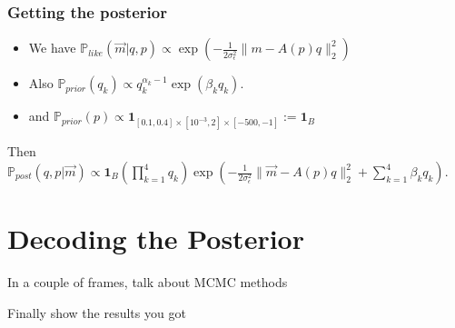 \documentclass[11pt]{beamer}
\theoremstyle{plain}
\theoremstyle{definition}
\newcommand{\p}{\mathbb{P}}
\newcommand{\like}{\p_{like}}
\newcommand{\prior}{\p_{prior}}
\newcommand{\post}{\p_{post}}
\begin{document}
\begin{frame}
\frametitle{Getting the posterior}
\begin{itemize}
\item We have $\like(\vec{m}|q,p)\propto
\exp(-\frac{1}{2\sigma_{\epsilon}^{2}}\|m-A(p)q\|^{2}_{2})$
\item Also $\prior(q_{k})\propto q_{k}^{\alpha_{k}-1}\exp(\beta_{k}q_{k})$.
\item and $\prior(p)\propto\textbf{1}_{[0.1,0.4]\times[10^{-3},2]\times[-500,-1]}
:=\textbf{1}_{B}$
\end{itemize}
\bigskip
Then
\newline 
\newline
$\post(q,p|\vec{m})\propto
\textbf{1}_{B}\left(\prod_{k=1}^{4}q_{k}\right)\exp(-\frac{1}{2\sigma_{\epsilon}^{2}}\|\vec{m}-A(p)q\|^{2}_{2}+
\sum_{k=1}^{4}\beta_{k}q_{k})$.
\end{frame}




\section{Decoding the Posterior}
\begin{frame}
In a couple of frames, talk about MCMC methods
\end{frame}

\begin{frame}
Finally show the results you got
\end{frame}
\end{document}
